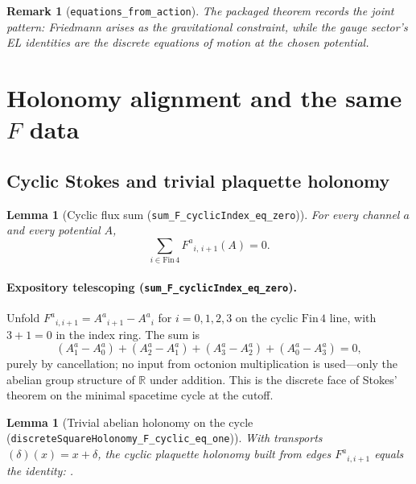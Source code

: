 \documentclass[11pt]{amsart}
\newtheorem{lemma}[theorem]{Lemma}
\newtheorem{remark}[theorem]{Remark}
\begin{document}
\begin{remark}[\texorpdfstring{\texttt{equations\_from\_action}}{equations_from_action}]
The packaged theorem  records the joint pattern: Friedmann arises as the gravitational constraint, while the gauge sector's EL identities are the discrete equations of motion at the chosen potential.
\end{remark}

\section{Holonomy alignment and the same \texorpdfstring{$F$}{F} data}
\label{sec:holonomy}

\subsection{Cyclic Stokes and trivial plaquette holonomy}

\begin{lemma}[Cyclic flux sum (\texorpdfstring{\texttt{sum\_F\_cyclicIndex\_eq\_zero}}{sum_F_cyclicIndex_eq_zero})]
\label{lem:stokes}
For every channel \(a\) and every potential \(A\),
\[
\sum_{i\in \mathrm{Fin}\,4} F^a{}_{i,\,i+1}(A) = 0 .
\]
\end{lemma}

\paragraph{Expository telescoping (\texorpdfstring{\texttt{sum\_F\_cyclicIndex\_eq\_zero}}{sum_F_cyclicIndex_eq_zero}).}
Unfold \(F^a{}_{i,i+1}=A^a{}_{i+1}-A^a{}_i\) for \(i=0,1,2,3\) on the cyclic \(\mathrm{Fin}\,4\) line, with \(3+1=0\) in the index ring. The sum is
\[
(A^a_1{-}A^a_0)+(A^a_2{-}A^a_1)+(A^a_3{-}A^a_2)+(A^a_0{-}A^a_3)=0,
\]
purely by cancellation; no input from octonion multiplication is used---only the abelian group structure of \(\mathbb{R}\) under addition. This is the discrete face of Stokes' theorem on the minimal spacetime cycle at the cutoff.

\begin{lemma}[Trivial abelian holonomy on the cycle (\texorpdfstring{\texttt{discreteSquareHolonomy\_F\_cyclic\_eq\_one}}{discreteSquareHolonomy})]
\label{lem:hol-one}
With transports  \((\delta)(x)=x+\delta\), the cyclic plaquette holonomy built from edges \(F^a{}_{i,i+1}\) equals the identity: .
\end{lemma}
\end{document}
